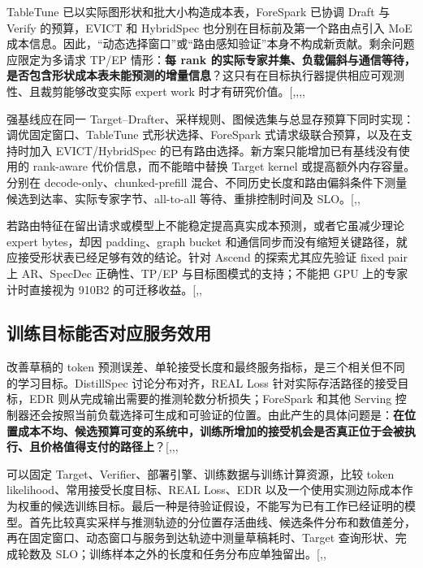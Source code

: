 \documentclass[
  a4paper,
  UTF8,
  fontset=none,
  zihao=5]{ctexart}
\begin{document}
TableTune 已以实际图形状和批大小构造成本表，ForeSpark 已协调 Draft 与
Verify 的预算，EVICT 和 HybridSpec 也分别在目标前及第一个路由点引入 MoE
成本信息。因此，``动态选择窗口''或``路由感知验证''本身不构成新贡献。剩余问题应限定为多请求
TP/EP 情形：\textbf{每 rank
的实际专家并集、负载偏斜与通信等待，是否包含形状成本表未能预测的增量信息}？这只有在目标执行器提供相应可观测性、且裁剪能够改变实际
expert work
时才有研究价值。{[},,,,\citeproc{ref-moebytes}{54}{]}

强基线应在同一
Target--Drafter、采样规则、图候选集与总显存预算下同时实现：调优固定窗口、TableTune
式形状选择、ForeSpark 式请求级联合预算，以及在支持时加入
EVICT/HybridSpec 的已有路由选择。新方案只能增加已有基线没有使用的
rank-aware 代价信息，而不能暗中替换 Target kernel
或提高额外内存容量。分别在 decode-only、chunked-prefill
混合、不同历史长度和路由偏斜条件下测量候选到达率、实际专家字节、all-to-all
等待、重排控制时间及
SLO。{[},,\citeproc{ref-moebytes}{54}{]}

若路由特征在留出请求或模型上不能稳定提高真实成本预测，或者它虽减少理论
expert bytes，却因 padding、graph bucket
和通信同步而没有缩短关键路径，就应接受形状表已经足够有效的结论。针对
Ascend 的探索尤其应先验证 fixed pair 上 AR、SpecDec 正确性、TP/EP
与目标图模式的支持；不能把 GPU 上的专家计时直接视为 910B2
的可迁移收益。{[},,\citeproc{ref-specsearch}{61}{]}

\subsection{训练目标能否对应服务效用}\label{training-to-serving}

改善草稿的 token
预测误差、单轮接受长度和最终服务指标，是三个相关但不同的学习目标。DistillSpec
讨论分布对齐，REAL Loss 针对实际存活路径的接受目标，EDR
则从完成输出需要的推测轮数分析损失；ForeSpark 和其他 Serving
控制器还会按照当前负载选择可生成和可验证的位置。由此产生的具体问题是：\textbf{在位置成本不均、候选预算可变的系统中，训练所增加的接受机会是否真正位于会被执行、且价格值得支付的路径上}？{[},,,\citeproc{ref-edr}{44}{]}

可以固定 Target、Verifier、部署引擎、训练数据与训练计算资源，比较 token
likelihood、常用接受长度目标、REAL Loss、EDR
以及一个使用实测边际成本作为权重的候选训练目标。最后一种是待验证假设，不能写为已有工作已经证明的模型。首先比较真实采样与推测轨迹的分位置存活曲线、候选条件分布和数值差分，再在固定窗口、动态窗口与服务到达轨迹中测量草稿耗时、Target
查询形状、完成轮数及
SLO；训练样本之外的长度和任务分布应单独留出。{[},,\citeproc{ref-edr}{44}{]}
\end{document}
